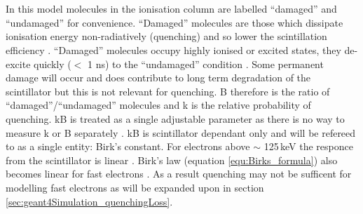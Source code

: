 \\\\In this model molecules in the ionisation column are labelled ``damaged'' and ``undamaged'' for convenience. ``Damaged'' molecules are those which dissipate ionisation energy non-radiatively (quenching) and so lower the scintillation efficiency\cite{craun_1970} \cite{knoll_2010}. ``Damaged'' molecules occupy highly ionised or excited states, they de-excite quickly ($<$ 1 ns) to the ``undamaged'' condition \cite{craun_1970}. Some permanent damage will occur and does contribute to long term degradation of the scintillator but this is not relevant for quenching\cite{craun_1970}. B therefore is the ratio of ``damaged''/``undamaged'' molecules and k is the relative probability of quenching. kB is treated as a single adjustable parameter as there is no way to measure k or B separately \cite{craun_1970} \cite{knoll_2010}. kB is scintillator dependant only and will be refereed to as a single entity: Birk's constant. For electrons above $\sim$ 125\,keV the responce from the scintillator is linear \cite{craun_1970}. Birk's law (equation \ref{equ:Birks_formula}) also becomes linear for fast electrons \cite{knoll_2010}. As a result quenching may not be sufficent for modelling fast electrons as will be expanded upon in section \ref{sec:geant4Simulation_quenchingLoss}. 
